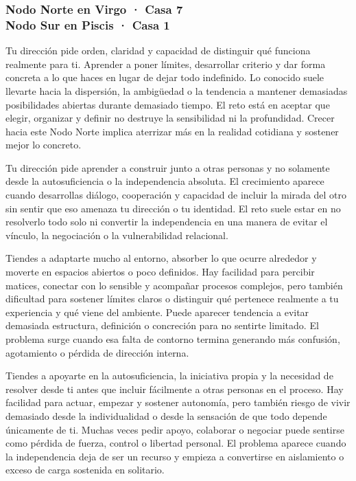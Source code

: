 \documentclass[11pt,a4paper]{article}
\begin{document}
\subsubsection*{Nodo Norte en Virgo · Casa 7 \\
Nodo Sur en Piscis · Casa 1}

Tu dirección pide orden, claridad y capacidad de distinguir qué funciona realmente para ti. Aprender a poner límites, desarrollar criterio y dar forma concreta a lo que haces en lugar de dejar todo indefinido. Lo conocido suele llevarte hacia la dispersión, la ambigüedad o la tendencia a mantener demasiadas posibilidades abiertas durante demasiado tiempo. El reto está en aceptar que elegir, organizar y definir no destruye la sensibilidad ni la profundidad. Crecer hacia este Nodo Norte implica aterrizar más en la realidad cotidiana y sostener mejor lo concreto.

Tu dirección pide aprender a construir junto a otras personas y no solamente desde la autosuficiencia o la independencia absoluta. El crecimiento aparece cuando desarrollas diálogo, cooperación y capacidad de incluir la mirada del otro sin sentir que eso amenaza tu dirección o tu identidad. El reto suele estar en no resolverlo todo solo ni convertir la independencia en una manera de evitar el vínculo, la negociación o la vulnerabilidad relacional.

Tiendes a adaptarte mucho al entorno, absorber lo que ocurre alrededor y moverte en espacios abiertos o poco definidos. Hay facilidad para percibir matices, conectar con lo sensible y acompañar procesos complejos, pero también dificultad para sostener límites claros o distinguir qué pertenece realmente a tu experiencia y qué viene del ambiente. Puede aparecer tendencia a evitar demasiada estructura, definición o concreción para no sentirte limitado. El problema surge cuando esa falta de contorno termina generando más confusión, agotamiento o pérdida de dirección interna.

Tiendes a apoyarte en la autosuficiencia, la iniciativa propia y la necesidad de resolver desde ti antes que incluir fácilmente a otras personas en el proceso. Hay facilidad para actuar, empezar y sostener autonomía, pero también riesgo de vivir demasiado desde la individualidad o desde la sensación de que todo depende únicamente de ti. Muchas veces pedir apoyo, colaborar o negociar puede sentirse como pérdida de fuerza, control o libertad personal. El problema aparece cuando la independencia deja de ser un recurso y empieza a convertirse en aislamiento o exceso de carga sostenida en solitario.
\end{document}
